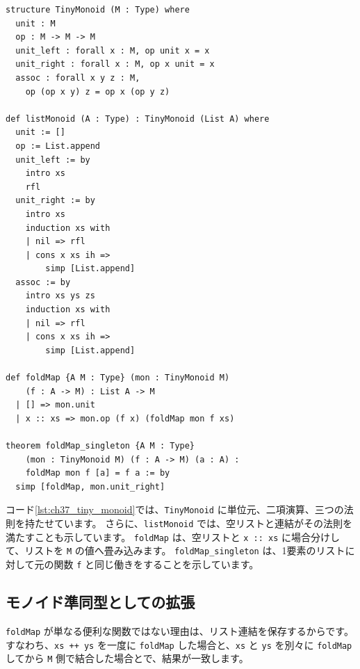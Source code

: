 \begin{listing}[htbp]
\begin{verbatim}
structure TinyMonoid (M : Type) where
  unit : M
  op : M -> M -> M
  unit_left : forall x : M, op unit x = x
  unit_right : forall x : M, op x unit = x
  assoc : forall x y z : M,
    op (op x y) z = op x (op y z)

def listMonoid (A : Type) : TinyMonoid (List A) where
  unit := []
  op := List.append
  unit_left := by
    intro xs
    rfl
  unit_right := by
    intro xs
    induction xs with
    | nil => rfl
    | cons x xs ih =>
        simp [List.append]
  assoc := by
    intro xs ys zs
    induction xs with
    | nil => rfl
    | cons x xs ih =>
        simp [List.append]

def foldMap {A M : Type} (mon : TinyMonoid M)
    (f : A -> M) : List A -> M
  | [] => mon.unit
  | x :: xs => mon.op (f x) (foldMap mon f xs)

theorem foldMap_singleton {A M : Type}
    (mon : TinyMonoid M) (f : A -> M) (a : A) :
    foldMap mon f [a] = f a := by
  simp [foldMap, mon.unit_right]
\end{verbatim}
\caption{\texttt{TinyMonoid}・\texttt{listMonoid}・\texttt{foldMap}}
\label{lst:ch37_tiny_monoid}
\end{listing}

コード\ref{lst:ch37_tiny_monoid}では、\texttt{TinyMonoid} に単位元、二項演算、三つの法則を持たせています。
さらに、\texttt{listMonoid} では、空リストと連結がその法則を満たすことも示しています。
\texttt{foldMap} は、空リストと \texttt{x :: xs} に場合分けして、リストを \texttt{M} の値へ畳み込みます。
\texttt{foldMap\_singleton} は、1要素のリストに対して元の関数 \texttt{f} と同じ働きをすることを示しています。

\subsection{モノイド準同型としての拡張}

\texttt{foldMap} が単なる便利な関数ではない理由は、リスト連結を保存するからです。
すなわち、\texttt{xs ++ ys} を一度に \texttt{foldMap} した場合と、\texttt{xs} と \texttt{ys} を別々に \texttt{foldMap} してから \texttt{M} 側で結合した場合とで、結果が一致します。

